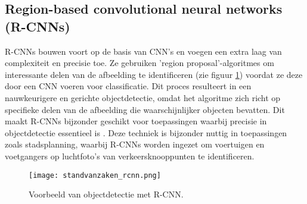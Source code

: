 \subsection{Region-based convolutional neural networks (R-CNNs)}
R-CNNs bouwen voort op de basis van CNN's en voegen een extra laag van complexiteit en precisie toe. Ze gebruiken 'region proposal'-algoritmes om interessante delen van de afbeelding te identificeren (zie figuur \ref{fig:standvanzaken_rcnn}) voordat ze deze door een CNN voeren voor classificatie. Dit proces resulteert in een nauwkeurigere en gerichte objectdetectie, omdat het algoritme zich richt op specifieke delen van de afbeelding die waarschijnlijker objecten bevatten. Dit maakt R-CNNs bijzonder geschikt voor toepassingen waarbij precisie in objectdetectie essentieel is \autocite{zhang2014part}.
Deze techniek is bijzonder nuttig in toepassingen zoals stadsplanning, waarbij R-CNNs worden ingezet om voertuigen en voetgangers op luchtfoto's van verkeersknooppunten te identificeren.
\newline
\begin{figure}[H]
  \centering
  \texttt{[image: standvanzaken\_rcnn.png]}
  \caption{Voorbeeld van objectdetectie met R-CNN. \cite{towardsdatascience_rcnn}}
  \label{fig:standvanzaken_rcnn}  
\end{figure}
\newline
